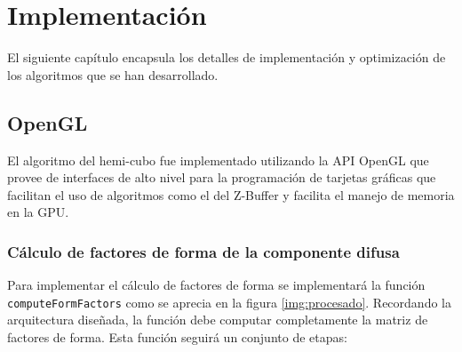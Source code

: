 \chapter{Implementación}
\label{ch:chap04}

El siguiente capítulo encapsula los detalles de implementación y optimización de los algoritmos que se han desarrollado.

\section{OpenGL}
\label{sec:opengl-impl}

El algoritmo del hemi-cubo fue implementado utilizando la API OpenGL que provee de interfaces de alto nivel para la programación de tarjetas gráficas que facilitan el uso de algoritmos como el del Z-Buffer y facilita el manejo de memoria en la GPU.

\subsection{Cálculo de factores de forma de la componente difusa}
\label{sec:hemicubehgl}
Para implementar el cálculo de factores de forma se implementará la función \verb|computeFormFactors| como se aprecia en la figura \ref{img:procesado}. Recordando la arquitectura diseñada, la función debe computar completamente la matriz de factores de forma. Esta función seguirá un conjunto de etapas:

